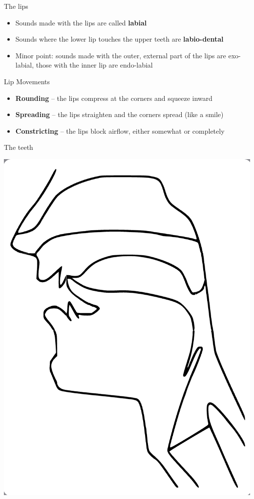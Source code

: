 \documentclass[professionalfonts]{beamer}
\begin{document}
\begin{frame}{The lips}
    \begin{itemize}
        \item Sounds made with the lips are called \textbf{labial}
        \item Sounds where the lower lip touches the upper teeth are \textbf{labio-dental}
        \item Minor point: sounds made with the outer, external part of the lips are exo-labial, those with the inner lip are endo-labial 
    \end{itemize}
\end{frame}

\begin{frame}{Lip Movements}
    \begin{itemize}
        \item \textbf{Rounding} – the lips compress at the corners and squeeze inward
        \item \textbf{Spreading} – the lips straighten and the corners spread (like a smile)
        \item \textbf{Constricting} – the lips block airflow, either somewhat or completely    
    \end{itemize}
    \end{frame}

\begin{frame}{The teeth}
    \begin{center}
        \includegraphics[width = .5\textwidth]{figs/Dentals.png}
    \end{center}
\end{frame}
\end{document}
